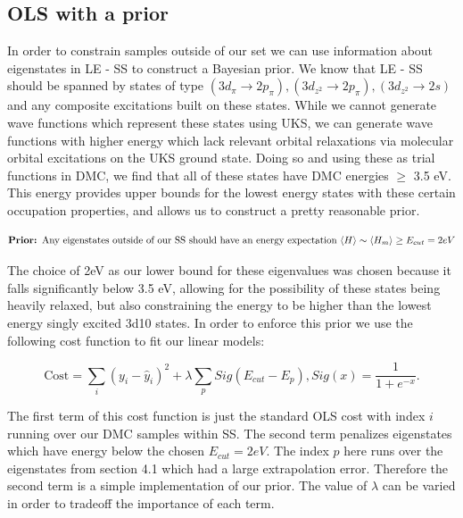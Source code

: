 \documentclass{article}
\begin{document}
\subsection{OLS with a prior}
In order to constrain samples outside of our set we can use information about eigenstates in LE - SS to construct a Bayesian prior. We know that LE - SS should be spanned by states of type $(3d_\pi \rightarrow 2p_\pi), (3d_{z^2} \rightarrow 2p_\pi), (3d_{z^2} \rightarrow 2s)$ and any composite excitations built on these states. While we cannot generate wave functions which represent these states using UKS, we can generate wave functions with higher energy which lack relevant orbital relaxations via molecular orbital excitations on the UKS ground state. Doing so and using these as trial functions in DMC, we find that all of these states have DMC energies $\geq$ 3.5 eV. This energy provides upper bounds for the lowest energy states with these certain occupation properties, and allows us to construct a pretty reasonable prior. 

$$\text{\textbf{Prior: }Any eigenstates outside of our SS should have an energy expectation } \langle H \rangle \sim \langle H_m \rangle \ge E_{cut} = 2 eV$$

The choice of 2eV as our lower bound for these eigenvalues was chosen because it falls significantly below 3.5 eV, allowing for the possibility of these states being heavily relaxed, but also constraining the energy to be higher than the lowest energy singly excited 3d10 states. In order to enforce this prior we use the following cost function to fit our linear models:

$$ \text{Cost} = \sum_i (y_i - \hat{y}_i)^2 + \lambda\sum_p Sig(E_{cut} - E_p), Sig(x) = \frac{1}{1+e^{-x}}.$$

The first term of this cost function is just the standard OLS cost with index $i$ running over our DMC samples within SS. The second term penalizes eigenstates which have energy below the chosen $E_{cut} = 2eV$. The index $p$ here runs over the eigenstates from section 4.1 which had a large extrapolation error. Therefore the second term is a simple implementation of our prior. The value of $\lambda$ can be varied in order to tradeoff the importance of each term. 
\end{document}

